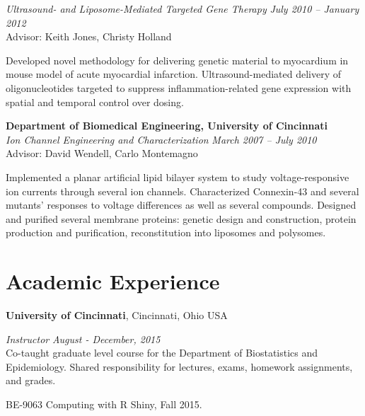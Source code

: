 \documentclass[margin,line]{res}
\newenvironment{list1}{
  \begin{list}{\ding{113}}{%
      \setlength{\itemsep}{0in}
      \setlength{\parsep}{0in} \setlength{\parskip}{0in}
      \setlength{\topsep}{0in} \setlength{\partopsep}{0in} 
      \setlength{\leftmargin}{0.17in}}}{\end{list}}
\newenvironment{list2}{
  \begin{list}{}{%
      \setlength{\itemsep}{0in}
      \setlength{\parsep}{0in} \setlength{\parskip}{0in}
      \setlength{\topsep}{0in} \setlength{\partopsep}{0in} 
      \setlength{\leftmargin}{0.4in}}}{\end{list}}
\begin{document}
\begin{resume}
\vspace{-0.2in}
\textsl{Ultrasound- and Liposome-Mediated Targeted Gene Therapy}
\hfill \textit{July 2010 -- January 2012} \\
Advisor: Keith Jones, Christy Holland \\
\vspace{-0.13in}
\begin{list1}
\item[] Developed novel methodology for delivering genetic material to myocardium in mouse model of acute myocardial infarction. Ultrasound-mediated delivery of oligonucleotides targeted to suppress inflammation-related gene expression with spatial and temporal control over dosing.
\end{list1}


\textbf{Department of Biomedical Engineering, University of Cincinnati}\\

\vspace{-0.2in}
\textsl{Ion Channel Engineering and Characterization}
\hfill \textit{March 2007 -- July 2010} \\ 
Advisor: David Wendell, Carlo Montemagno \\
\vspace{-0.13in}
\begin{list1}
\item[] Implemented a planar artificial lipid bilayer system to study voltage-responsive ion currents through several ion channels. Characterized Connexin-43 and several mutants' responses to voltage differences as well as several compounds. Designed and purified several membrane proteins: genetic design and construction, protein production and purification, reconstitution into liposomes and polysomes.
\end{list1}


\section{\sc Academic Experience}
{\bf University of Cincinnati}, Cincinnati, Ohio USA

{\em Instructor} \hfill \textit{August - December, 2015}\\
Co-taught graduate level course for the Department of Biostatistics and Epidemiology.  Shared responsibility for lectures, exams,
homework assignments, and  grades.  
\vspace*{.05in}  
\begin{list2}
\item BE-9063 Computing with R Shiny, Fall 2015.
\end{list2}




\end{resume}
\end{document}
